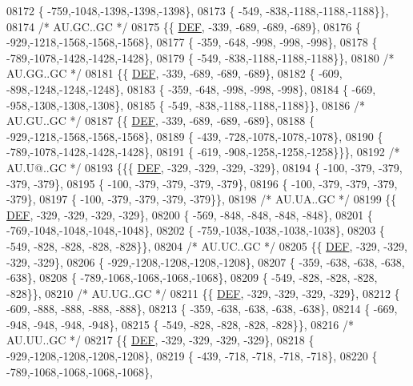 \begin{DoxyCode}
08172 \{ -759,-1048,-1398,-1398,-1398\},
08173 \{ -549, -838,-1188,-1188,-1188\}\},
08174 \textcolor{comment}{/* AU.GC..GC */}
08175 \{\{  \mbox{\hyperlink{1_88_84__epars_8h_a397419fc12b37ed479c8abb9d444d843}{DEF}}, -339, -689, -689, -689\},
08176 \{ -929,-1218,-1568,-1568,-1568\},
08177 \{ -359, -648, -998, -998, -998\},
08178 \{ -789,-1078,-1428,-1428,-1428\},
08179 \{ -549, -838,-1188,-1188,-1188\}\},
08180 \textcolor{comment}{/* AU.GG..GC */}
08181 \{\{  \mbox{\hyperlink{1_88_84__epars_8h_a397419fc12b37ed479c8abb9d444d843}{DEF}}, -339, -689, -689, -689\},
08182 \{ -609, -898,-1248,-1248,-1248\},
08183 \{ -359, -648, -998, -998, -998\},
08184 \{ -669, -958,-1308,-1308,-1308\},
08185 \{ -549, -838,-1188,-1188,-1188\}\},
08186 \textcolor{comment}{/* AU.GU..GC */}
08187 \{\{  \mbox{\hyperlink{1_88_84__epars_8h_a397419fc12b37ed479c8abb9d444d843}{DEF}}, -339, -689, -689, -689\},
08188 \{ -929,-1218,-1568,-1568,-1568\},
08189 \{ -439, -728,-1078,-1078,-1078\},
08190 \{ -789,-1078,-1428,-1428,-1428\},
08191 \{ -619, -908,-1258,-1258,-1258\}\}\},
08192 \textcolor{comment}{/* AU.U@..GC */}
08193 \{\{\{  \mbox{\hyperlink{1_88_84__epars_8h_a397419fc12b37ed479c8abb9d444d843}{DEF}}, -329, -329, -329, -329\},
08194 \{ -100, -379, -379, -379, -379\},
08195 \{ -100, -379, -379, -379, -379\},
08196 \{ -100, -379, -379, -379, -379\},
08197 \{ -100, -379, -379, -379, -379\}\},
08198 \textcolor{comment}{/* AU.UA..GC */}
08199 \{\{  \mbox{\hyperlink{1_88_84__epars_8h_a397419fc12b37ed479c8abb9d444d843}{DEF}}, -329, -329, -329, -329\},
08200 \{ -569, -848, -848, -848, -848\},
08201 \{ -769,-1048,-1048,-1048,-1048\},
08202 \{ -759,-1038,-1038,-1038,-1038\},
08203 \{ -549, -828, -828, -828, -828\}\},
08204 \textcolor{comment}{/* AU.UC..GC */}
08205 \{\{  \mbox{\hyperlink{1_88_84__epars_8h_a397419fc12b37ed479c8abb9d444d843}{DEF}}, -329, -329, -329, -329\},
08206 \{ -929,-1208,-1208,-1208,-1208\},
08207 \{ -359, -638, -638, -638, -638\},
08208 \{ -789,-1068,-1068,-1068,-1068\},
08209 \{ -549, -828, -828, -828, -828\}\},
08210 \textcolor{comment}{/* AU.UG..GC */}
08211 \{\{  \mbox{\hyperlink{1_88_84__epars_8h_a397419fc12b37ed479c8abb9d444d843}{DEF}}, -329, -329, -329, -329\},
08212 \{ -609, -888, -888, -888, -888\},
08213 \{ -359, -638, -638, -638, -638\},
08214 \{ -669, -948, -948, -948, -948\},
08215 \{ -549, -828, -828, -828, -828\}\},
08216 \textcolor{comment}{/* AU.UU..GC */}
08217 \{\{  \mbox{\hyperlink{1_88_84__epars_8h_a397419fc12b37ed479c8abb9d444d843}{DEF}}, -329, -329, -329, -329\},
08218 \{ -929,-1208,-1208,-1208,-1208\},
08219 \{ -439, -718, -718, -718, -718\},
08220 \{ -789,-1068,-1068,-1068,-1068\},

\end{DoxyCode}
